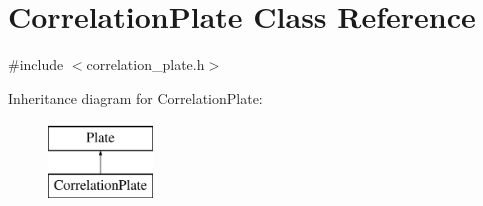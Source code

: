 \hypertarget{class_correlation_plate}{\section{Correlation\-Plate Class Reference}
\label{class_correlation_plate}
}


{\ttfamily \#include $<$correlation\-\_\-plate.\-h$>$}

Inheritance diagram for Correlation\-Plate\-:\begin{figure}[H]
\begin{center}
\leavevmode
\includegraphics[height=2.000000cm]{class_correlation_plate}
\end{center}
\end{figure}
